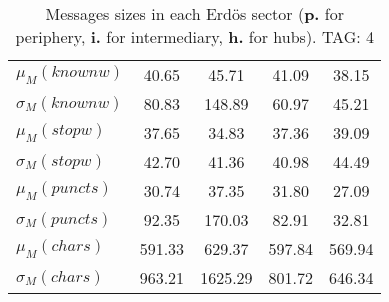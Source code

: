 \begin{table}[h!]
\begin{center}
\begin{tabular}{| l || c | c | c | c |}
$\mu_M(knownw)$ & 40.65  & 45.71  & 41.09  & 38.15 \\
$\sigma_M(knownw)$ & 80.83  & 148.89  & 60.97  & 45.21 \\\hline
$\mu_M(stopw)$ & 37.65  & 34.83  & 37.36  & 39.09 \\
$\sigma_M(stopw)$ & 42.70  & 41.36  & 40.98  & 44.49 \\\hline
$\mu_M(puncts)$ & 30.74  & 37.35  & 31.80  & 27.09 \\
$\sigma_M(puncts)$ & 92.35  & 170.03  & 82.91  & 32.81 \\\hline
$\mu_M(chars)$ & 591.33  & 629.37  & 597.84  & 569.94 \\
$\sigma_M(chars)$ & 963.21  & 1625.29  & 801.72  & 646.34 \\\hline
\end{tabular}
\caption{Messages sizes in each Erd\"os sector ({{\bf p.}} for periphery, {{\bf i.}} for intermediary, {{\bf h.}} for hubs). TAG: 4}
\end{center}
\end{table}